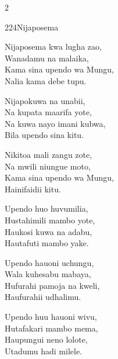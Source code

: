 \begin{multicols}{2}
\begin{hymn}{224}{Nijaposema}{}
\begin{stanza}
Nijaposema kwa lugha zao,\\
Wanadamu na malaika,\\
Kama sina upendo wa Mungu,\\
Nalia kama debe tupu.
\end{stanza}
\begin{stanza}
Nijapokuwa na unabii,\\
Na kupata maarifa yote,\\
Na kuwa nayo imani kubwa,\\
Bila upendo sina kitu.
\end{stanza}
\begin{stanza}
Nikitoa mali zangu zote,\\
Na mwili niungue moto,\\
Kama sina upendo wa Mungu,\\
Hainifaidii kitu.
\end{stanza}
\begin{stanza}
Upendo huo huvumilia,\\
Hustahimili mambo yote,\\
Haukosi kuwa na adabu,\\
Hautafuti mambo yake.
\end{stanza}
\begin{stanza}
Upendo hauoni uchungu,\\
Wala kuhesabu mabaya,\\
Hufurahi pamoja na kweli,\\
Haufurahii udhalimu.
\end{stanza}
\begin{stanza}
Upendo huu hauoni wivu,\\
Hutafakari mambo mema,\\
Haupungui neno lolote,\\
Utadumu hadi milele.
\end{stanza}
\end{hymn}


\end{multicols}
